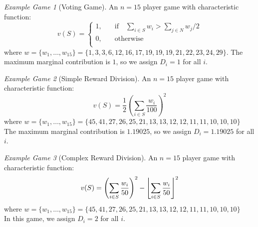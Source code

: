 \documentclass[]{interact}
\DeclarePairedDelimiter{\floor}{\lfloor}{\rfloor}
\theoremstyle{plain}%
\theoremstyle{definition}
\theoremstyle{remark}
\newtheorem{example_game}{Example Game}
\begin{document}
\begin{example_game}[Voting Game]
An $n=15$ player game with characteristic function:
$$v(S)=\begin{cases}
       1, &\quad\text{if}\quad \sum_{i\in S}w_i>\sum_{j\in N}w_j/2\\
       0, &\quad\text{otherwise}\\
     \end{cases}$$
where 
$w=\{w_1,\dots,w_{15}\} %
=\{ 1, 3, 3, 6, 12, 16, 17, 19, 19, 19, 21, 22, 23, 24, 29\}$.
The maximum marginal contribution is $1$, so we assign $D_i=1$ for all $i$.
\end{example_game}

\begin{example_game}[Simple Reward Division]
An $n=15$ player game with characteristic function:
$$v(S)=\frac{1}{2}\left(\sum_{i\in S}\frac{w_i}{100}\right)^2$$
where
$w=\{w_1,\dots,w_{15}\} = \{ 45, 41, 27, 26, 25, 21, 13, 13, 12, 12, 11, 11, 10, 10, 10 \}$\\
The maximum marginal contribution is $1.19025$, so we assign $D_i=1.19025$ for all $i$.
\end{example_game}

\begin{example_game}[Complex Reward Division]
An $n=15$ player game with characteristic function:
$$v(S)=\left(\sum_{i\in S}\frac{w_i}{50}\right)^2 - \floor[\Bigg]{\sum_{i\in S}\frac{w_i}{50}}^2$$
where
$w=\{w_1,\dots,w_{15}\} = \{ 45, 41, 27, 26, 25, 21, 13, 13, 12, 12, 11, 11, 10, 10, 10 \}$\\
In this game, we assign $D_i=2$ for all $i$.
\end{example_game}

%
\end{document}
